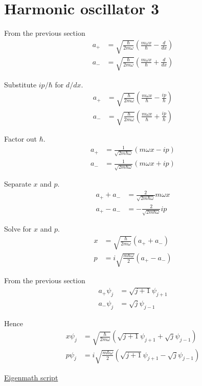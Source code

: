 

\section*{Harmonic oscillator 3}

From the previous section
\begin{align*}
a_+&=\sqrt{\frac{\hbar}{2m\omega}}
\left(\frac{m\omega x}{\hbar}-\frac{d}{dx}\right)
\\[1ex]
a_-&=\sqrt{\frac{\hbar}{2m\omega}}
\left(\frac{m\omega x}{\hbar}+\frac{d}{dx}\right)
\end{align*}

Substitute $ip/\hbar$ for $d/dx$.
\begin{align*}
a_+&=\sqrt{\frac{\hbar}{2m\omega}}
\left(\frac{m\omega x}{\hbar}-\frac{ip}{\hbar}\right)
\\[1ex]
a_-&=\sqrt{\frac{\hbar}{2m\omega}}
\left(\frac{m\omega x}{\hbar}+\frac{ip}{\hbar}\right)
\end{align*}

Factor out $\hbar$.
\begin{align*}
a_+&=\frac{1}{\sqrt{2m\hbar\omega}}(m\omega x-ip)
\\[1ex]
a_-&=\frac{1}{\sqrt{2m\hbar\omega}}(m\omega x+ip)
\end{align*}

Separate $x$ and $p$.
\begin{align*}
a_++a_-&=\frac{2}{\sqrt{2m\hbar\omega}}m\omega x
\\
a_+-a_-&=-\frac{2}{\sqrt{2m\hbar\omega}}ip
\end{align*}

Solve for $x$ and $p$.
\begin{align*}
x&=\sqrt{\frac{\hbar}{2m\omega}}(a_++a_-)\tag{1}
\\[1ex]
p&=i\sqrt{\frac{m\hbar\omega}{2}}(a_+-a_-)\tag{2}
\end{align*}

From the previous section
\begin{align*}
a_+\psi_j&=\sqrt{j+1}\psi_{j+1}
\\
a_-\psi_j&=\sqrt j\psi_{j-1}
\end{align*}

Hence
\begin{align*}
x\psi_j&=\sqrt{\frac{\hbar}{2m\omega}}\left(\sqrt{j+1}\psi_{j+1}+\sqrt j\psi_{j-1}\right)
\\[1ex]
p\psi_j&=i\sqrt{\frac{m\hbar\omega}{2}}\left(\sqrt{j+1}\psi_{j+1}-\sqrt j\psi_{j-1}\right)
\end{align*}

\href{https://georgeweigt.github.io/examples/harmonic-oscillator-3-demo.html}{Eigenmath script}



